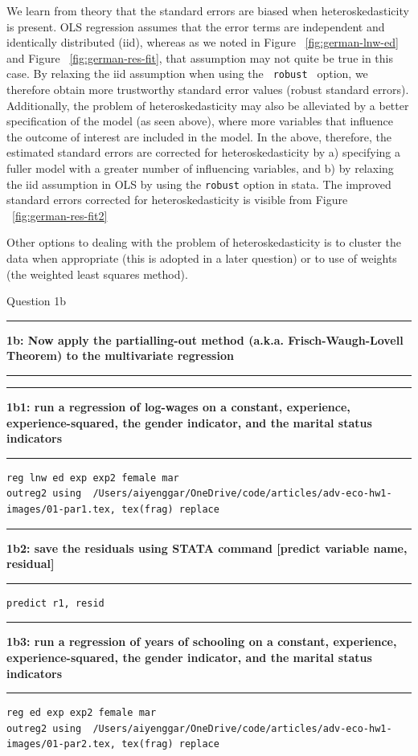 \documentclass[12pt]{article}
\newcommand\question[2]{\vspace{1em}\hrule\vspace{1em}\textbf{#1: #2}\vspace{1em}\hrule\vspace{1em}}
\begin{document}
We learn from theory that the standard errors are biased when heteroskedasticity is present. OLS regression assumes that the error terms are independent and identically distributed (iid), whereas as we noted in Figure ~\ref{fig:german-lnw-ed} and Figure ~\ref{fig:german-res-fit}, that assumption may not quite be true in this case. By relaxing the iid assumption when using the \verb| robust | option, we therefore obtain more trustworthy standard error values (robust standard errors). Additionally, the problem of heteroskedasticity may also be alleviated by a better specification of the model (as seen above), where more variables that influence the outcome of interest are included in the model. In the above, therefore, the estimated standard errors are corrected for heteroskedasticity by a) specifying a fuller model with a greater number of influencing variables, and b) by relaxing the iid assumption in OLS by using the \verb|robust| option in stata. The improved standard errors corrected for heteroskedasticity is visible from Figure ~\ref{fig:german-res-fit2}

Other options to dealing with the problem of heteroskedasticity  is to cluster the data when appropriate (this is adopted in a later question) or to use of weights (the weighted least squares method).

\begin{center}\LARGE{Question 1b}\end{center}
\question{1b}{Now apply the partialling-out method (a.k.a. Frisch-Waugh-Lovell Theorem) to the multivariate regression}

\question{1b1}{run a regression of log-wages on a constant, experience, experience-squared, the gender indicator, and the marital status indicators}
\begin{lstlisting}
reg lnw ed exp exp2 female mar
outreg2 using  /Users/aiyenggar/OneDrive/code/articles/adv-eco-hw1-images/01-par1.tex, tex(frag) replace
\end{lstlisting}


\question{1b2}{save the residuals using STATA command [predict variable name, residual]}
\begin{verbatim}predict r1, resid\end{verbatim}

\question{1b3}{run a regression of years of schooling on a constant, experience, experience-squared, the gender indicator, and the marital status indicators}
\begin{lstlisting}
reg ed exp exp2 female mar
outreg2 using  /Users/aiyenggar/OneDrive/code/articles/adv-eco-hw1-images/01-par2.tex, tex(frag) replace
\end{lstlisting}

\end{document}
